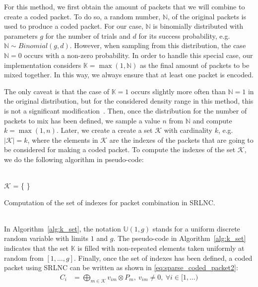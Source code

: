 For this method, we first obtain the amount of packets
that we will combine to create a coded packet. To do so, a random
number, $\mathbb{N}$, of the original packets is used to produce a
coded packet. For our case, $\mathbb{N}$ is binomially distributed
with parameters $g$ for the number of trials and $d$ for its success
probability, e.g. $\mathbb{N} \sim Binomial(g,d)$. However,
when sampling from this distribution, the case
$\mathbb{N} = 0$ occurs with a non-zero probability. In order to handle
this special case, our implementation considers
$\mathbb{K} = \max(1,\mathbb{N})$ as the final amount of packets to be
mixed together. In this way, we always ensure that at least one packet is
encoded.

The only caveat is that the case of $\mathbb{K} = 1$ occurs slightly
more often than $\mathbb{N} = 1$ in the original distribution, but for
the considered density range in this method, this is not a significant
modification~\cite{practicalview_tsnc2015}. Then, once the
distribution for the number of packets to mix has been defined, we
sample a value $n$ from $\mathbb{N}$ and compute $k =
\max(1,n)$. Later, we create a create a set $\mathcal{K}$ with
cardinality $k$, e.g. $|\mathcal{K}| = k$, where the elements in
$\mathcal{K}$ are the indexes of the packets that are going to be
considered for making a coded packet. To compute the indexes
of the set $\mathcal{K}$, we do the following algorithm in pseudo-code: \\
\ \\
\begin{algorithm}[H]
 \label{alg:k_set}
 $\mathcal{K}$ = \{ \}\;
 \caption{Computation of the set of indexes for packet combination in SRLNC.}
\end{algorithm}
\ \\
In Algorithm~\ref{alg:k_set}, the notation $\mathbb{U}(1,g)$ stands
for a uniform discrete random variable with limits $1$ and $g$. The
pseudo-code in Algorithm~\ref{alg:k_set} indicates that the set $\mathbb{K}$
is filled with non-repeated elements taken uniformly at random from
$[1,\ldots,g]$. Finally, once the set of indexes has been defined, a coded
packet using \ac{SRLNC} can be written as shown in
\eqref{eq:sparse_coded_packet2}:
%
\begin{align} \label{eq:sparse_coded_packet2}
    C_i  &= \bigoplus_{m \in \mathcal{K}} v_{im} \otimes P_{m},\ v_{im} \neq 0,\ \forall i \in [1,\ldots)
\end{align}

